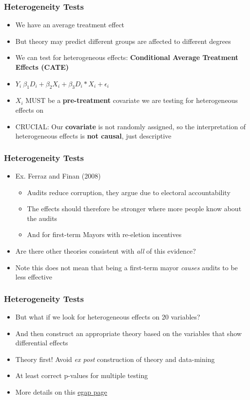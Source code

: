 \documentclass[xcolor=x11names,compress]{beamer}\usepackage[]{graphicx}\usepackage[]{color}
\renewcommand{\(}{\begin{columns}}
\renewcommand{\)}{\end{columns}}
\newcommand{\<}[1]{\begin{column}{#1}}
\renewcommand{\>}{\end{column}}
\begin{document}
\begin{frame}
\frametitle{Heterogeneity Tests}
\begin{itemize}
\item We have an average treatment effect
\pause
\item But theory may predict different groups are affected to different degrees
\pause
\item We can test for heterogeneous effects: \textbf{Conditional Average Treatment Effects (CATE)}
\pause
\item $Y_i ~ \beta_1 D_i + \beta_2 X_i + \beta_3 D_i*X_i + \epsilon_i$
\pause
\item $X_i$ MUST be a \textbf{pre-treatment} covariate we are testing for heterogeneous effects on
\pause
\item CRUCIAL: Our \textbf{covariate} is not randomly assigned, so the interpretation of heterogeneous effects is \textbf{not causal}, just descriptive
\end{itemize}
\end{frame}

\begin{frame}
\frametitle{Heterogeneity Tests}
\begin{itemize}
\item Ex. Ferraz and Finan (2008)
\begin{itemize}
\item Audits reduce corruption, they argue due to electoral accountability
\pause
\item The effects should therefore be stronger where more people know about the audits
\pause
\item And for first-term Mayors with re-eletion incentives
\end{itemize}
\item Are there other theories consistent with \textit{all} of this evidence?
\pause
\item Note this does not mean that being a first-term mayor \textit{causes} audits to be less effective
\end{itemize}
\end{frame}

\begin{frame}
\frametitle{Heterogeneity Tests}
\begin{itemize}
\item But what if we look for heterogeneous effects on 20 variables?
\pause
\item And then construct an appropriate theory based on the variables that show differential effects
\pause
\item Theory first! Avoid \textit{ex post} construction of theory and data-mining
\pause
\item At least correct p-values for multiple testing 
\pause
\item More details on this \href{https://egap.org/methods-guides/10-things-heterogeneous-treatment-effects}{egap page}
\end{itemize}
\end{frame}
\end{document}
